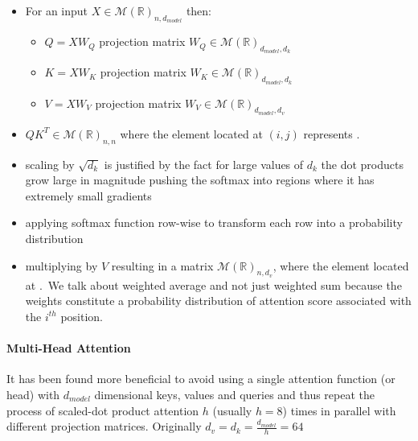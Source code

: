 \begin{itemize}
    \item For an input $X\in\mathcal{M}(\mathbb{R})_{n,d_{model}}$ then:
        \begin{itemize}
            \item $Q = XW_{Q}$ projection matrix $W_{Q} \in\mathcal{M}(\mathbb{R})_{d_{model},d_{k}}$
            \item $K = XW_{K}$ projection matrix $W_{K} \in\mathcal{M}(\mathbb{R})_{d_{model},d_{k}}$
            \item $V = XW_{V}$ projection matrix $W_{V} \in\mathcal{M}(\mathbb{R})_{d_{model},d_{v}}$
        \end{itemize}
        
    \item $QK^{T} \in\mathcal{M}(\mathbb{R})_{n,n}$ where the element located at $(i, j)$ represents
        .
    \item scaling by $\sqrt{d_{k}}$ is justified by the fact for large values of $d_{k}$ the dot 
        products grow large in magnitude pushing the softmax into regions where it has extremely 
        small gradients
    \item applying softmax function row-wise to transform each row into a probability distribution
    \item multiplying by $V$ resulting in a matrix $\mathcal{M}(\mathbb{R})_{n,d_{v}}$, where the 
        element located at .\
        We talk about weighted average and not just weighted sum because the weights constitute a 
        probability distribution of attention score associated with the $i^{th}$ position.
\end{itemize}


\paragraph{Multi-Head Attention}

It has been found more beneficial to avoid using a single attention function (or head) with 
$d_{model}$ dimensional keys, values and queries and thus repeat the process of scaled-dot product 
attention $h$ (usually $h=8$) times in parallel with different projection matrices.
Originally $d_{v}=d_{k}=\frac{d_{model}}{h} = 64$

